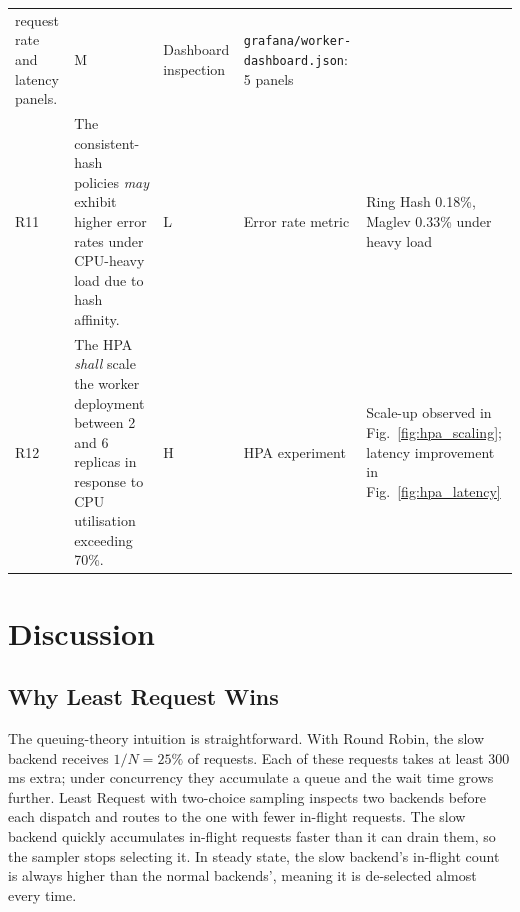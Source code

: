\documentclass[conference]{IEEEtran}
\begin{document}
\begin{table}[t]
\begin{tabular}{p{0.5cm}p{5.5cm}p{0.7cm}p{2.5cm}p{4.0cm}}
    request rate and latency panels.                        & M                                                                        &
    Dashboard inspection                                    &
    \texttt{grafana/worker-dashboard.json}: 5 panels                                                                                                                   \\
    R11                                                     & The consistent-hash policies \textit{may} exhibit higher error rates
    under CPU-heavy load due to hash affinity.              & L                                                                        &
    Error rate metric                                       &
    Ring Hash 0.18\%, Maglev 0.33\% under heavy load                                                                                                                   \\
    R12                                                     & The HPA \textit{shall} scale the worker deployment between 2 and 6
    replicas in response to CPU utilisation exceeding 70\%. & H                                                                        &
    HPA experiment                                          &
    Scale-up observed in Fig.~\ref{fig:hpa_scaling};
    latency improvement in Fig.~\ref{fig:hpa_latency}                                                                                                                  \\
    \bottomrule
  \end{tabular}
\end{table}

\section{Discussion}
\label{sec:discussion}

\subsection{Why Least Request Wins}

The queuing-theory intuition is straightforward.
With Round Robin, the slow backend receives $1/N = 25\%$ of requests.
Each of these requests takes at least 300\,ms extra; under concurrency they
accumulate a queue and the wait time grows further.
Least Request with two-choice sampling inspects two backends before each
dispatch and routes to the one with fewer in-flight requests.
The slow backend quickly accumulates in-flight requests faster than it can
drain them, so the sampler stops selecting it.
In steady state, the slow backend's in-flight count is always higher than the
normal backends', meaning it is de-selected almost every time.
\end{document}
